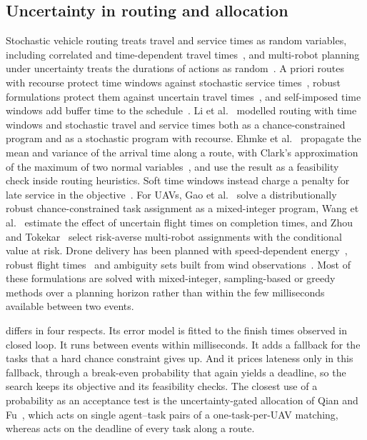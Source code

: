 
\subsection{Uncertainty in routing and allocation}
Stochastic vehicle routing treats travel and service times as random variables, including correlated and
time-dependent travel times~\cite{rostami2021correlated,bomboi2022stochastic}, and multi-robot planning under
uncertainty treats the durations of actions as random~\cite{lacerda2022decision}. A priori routes with recourse
protect time windows against stochastic service times~\cite{errico2016apriori}, robust formulations protect them
against uncertain travel times~\cite{agra2013robust}, and self-imposed time windows add buffer time to the
schedule~\cite{jabali2015selfimposed}. Li et al.~\cite{li2010vrptw} modelled routing with time windows and stochastic
travel and service times both as a chance-constrained program and as a stochastic program with recourse. Ehmke et al.~\cite{ehmke2015ensuring} propagate the mean and variance of the arrival time along a route, with
Clark's approximation of the maximum of two normal variables~\cite{clark1961greatest}, and use the result as a
feasibility check inside routing heuristics. Soft time windows instead charge a penalty for late service in the
objective~\cite{tas2013stochastic}. For UAVs, Gao et al.~\cite{gao2025drcc} solve a distributionally robust
chance-constrained task assignment as a mixed-integer program, Wang et al.~\cite{wang2024uncertain} estimate the effect
of uncertain flight times on completion times, and Zhou and Tokekar~\cite{zhou2022risk} select risk-averse multi-robot
assignments with the conditional value at risk. Drone delivery has been planned with speed-dependent
energy~\cite{dukkanci2021energy}, robust flight times~\cite{bruni2023drone} and ambiguity sets built from wind
observations~\cite{cheng2024weather}. Most of these formulations are solved with mixed-integer, sampling-based or greedy
methods over a planning horizon rather than within the few milliseconds available between two events.

\mname{} differs in four respects. Its error model is fitted to the finish times observed in closed loop. It runs
between events within milliseconds. It adds a fallback for the tasks that a hard chance constraint gives up. And it
prices lateness only in this fallback, through a break-even probability that again yields a deadline, so the search
keeps its objective and its feasibility checks. The closest use of a probability as an acceptance test is the
uncertainty-gated allocation of Qian and Fu~\cite{ucdg2026drones}, which acts on single agent--task pairs of a
one-task-per-UAV matching, whereas \mname{} acts on the deadline of every task along a route.
